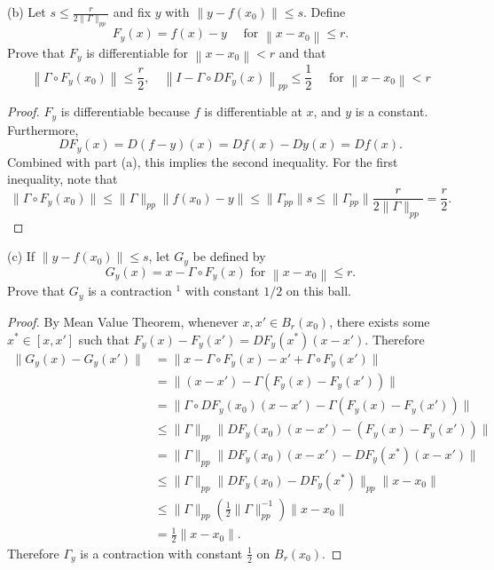 \newpage
(b) Let $s \leq \frac{r}{2\|\Gamma\|_{p p}}$ and fix $y$ with $\left\|y-f\left(x_0\right)\right\| \leq s$. Define
\[
F_y(x)=f(x)-y \quad \text { for }\left\|x-x_0\right\| \leq r .
\]
Prove that $F_y$ is differentiable for $\left\|x-x_0\right\|<r$ and that
\[
\left\|\Gamma \circ F_y\left(x_0\right)\right\| \leq \frac{r}{2}, \quad\left\|I-\Gamma \circ D F_y(x)\right\|_{p p} \leq \frac{1}{2} \quad \text { for }\left\|x-x_0\right\|<r
\]
\begin{proof}
	$F_y$ is differentiable because $f$ is differentiable at $x$, and $y$ is a constant. Furthermore,
	\[
		D F_y(x) = D(f - y)(x) = Df(x) - Dy(x) = Df(x)
	.\] 
	Combined with part (a), this implies the second inequality. For the first inequality, note that
	\[
		\|\Gamma \circ F_y(x_0)\| \le
		\|\Gamma\|_{pp} \|f(x_0) - y\| \le 
		\|\Gamma_{pp}\| s \le 
		\|\Gamma_{pp}\|\frac{r}{2\|\Gamma\|_{p p}} = \frac{r}{2}
	.\] 
\end{proof}
\newpage
(c) If $\left\|y-f\left(x_0\right)\right\| \leq s$, let $G_y$ be defined by
\[
G_y(x)=x-\Gamma \circ F_y(x) \text { for }\left\|x-x_0\right\| \leq r .
\]
Prove that $G_y$ is a contraction ${ }^1$ with constant $1 / 2$ on this ball.
\begin{proof}
	By Mean Value Theorem, whenever $x, x' \in B_r(x_0)$, there exists some $x^* \in [x, x']$ such that $F_y(x) - F_y(x') = DF_y(x^*)(x - x')$. Therefore
	\begin{align*}
		\|G_y(x) - G_y(x')\|&= 
		\|x - \Gamma \circ F_y(x) - x' + \Gamma \circ F_y(x')\|\\
		&= \|(x - x') - \Gamma \left( F_y(x) - F_y(x') \right) \| \\
		&= \|\Gamma \circ D F_y(x_0)(x - x') - \Gamma \left( F_y(x) - F_y(x') \right) \| \\
		&\le \|\Gamma\|_{pp} \|D F_y(x_0) (x - x') - \left( F_y(x) - F_y(x') \right) \| \\
		&= \|\Gamma\|_{pp} \|D F_y(x_0) (x - x') - DF_y(x^*) (x - x') \| \\
		&\le  \|\Gamma\|_{pp} \|D F_y(x_0) - DF_y(x^*) \|_{pp} \|x - x_0\| \\
		&\le \|\Gamma\|_{pp} \left( \frac{1}{2} \|\Gamma\|_{pp}^{-1}  \right)\|x - x_0\| \\
		&= \frac{1}{2} \|x - x_0\| 
	.\end{align*}
	Therefore $\Gamma_y$ is a contraction with constant $\frac{1}{2}$ on $B_r(x_0)$.
\end{proof}

